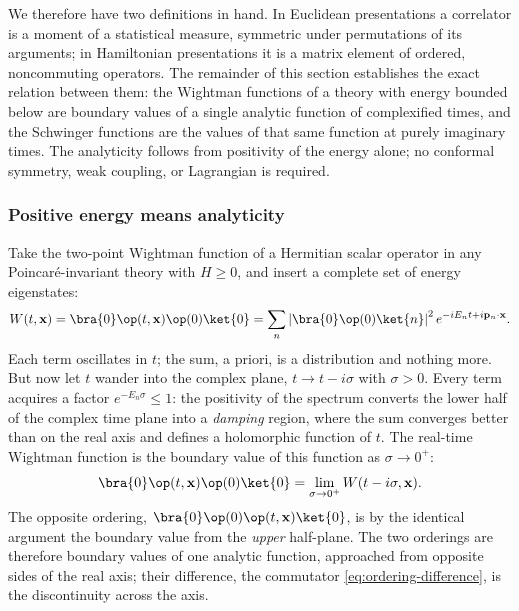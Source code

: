 We therefore have two definitions in hand. In Euclidean presentations a
correlator is a moment of a statistical measure, symmetric under permutations
of its arguments; in Hamiltonian presentations it is a matrix element of
ordered, noncommuting operators. The remainder of this section establishes
the exact relation between them: the Wightman functions of a theory with
energy bounded below are boundary values of a single analytic function of
complexified times, and the Schwinger functions are the values of that same
function at purely imaginary times. The analyticity follows from positivity
of the energy alone; no conformal symmetry, weak coupling, or Lagrangian is
required.

\subsubsection{Positive energy means analyticity}
\label{sec:positive-energy-analyticity}

Take the two-point Wightman function of a Hermitian scalar operator in any
Poincar\'e-invariant theory with $H \ge 0$, and insert a complete set of energy
eigenstates:
\begin{equation}
W(t, \mathbf{x}) = \bra{0}\op(t, \mathbf{x}) \op(0)\ket{0}
= \sum_n \left|\bra{0}\op(0)\ket{n}\right|^2 e^{-iE_n t + i \mathbf{p}_n \cdot \mathbf{x}}.
\label{eq:spectral-sum}
\end{equation}
Each term oscillates in $t$; the sum, a priori, is a distribution and nothing
more. But now let $t$ wander into the complex plane, $t \to t - i\sigma$ with
$\sigma > 0$. Every term acquires a factor $e^{-E_n \sigma} \le 1$: the
positivity of the spectrum converts the lower half of the complex time plane
into a \emph{damping} region, where the sum converges better than on the real
axis and defines a holomorphic function of $t$. The real-time Wightman function
is the boundary value of this function as $\sigma \to 0^+$:
\begin{equation}
\bra{0}\op(t,\mathbf{x})\op(0)\ket{0} = \lim_{\sigma \to 0^+} W(t - i\sigma, \mathbf{x}).
\label{eq:boundary-value}
\end{equation}
The opposite ordering, $\bra{0}\op(0)\op(t,\mathbf{x})\ket{0}$, is by the
identical argument the boundary value from the \emph{upper} half-plane. The
two orderings are therefore boundary values of one analytic function,
approached from opposite sides of the real axis; their difference, the
commutator \eqref{eq:ordering-difference}, is the discontinuity across the
axis.

